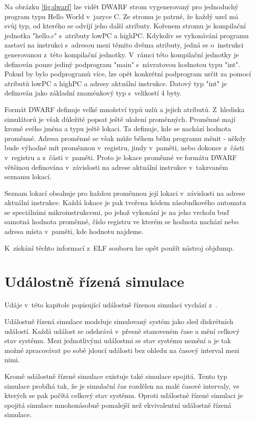 Na obrázku \ref{fig:dwarf} lze vidět DWARF strom vygenerovaný pro jednoduchý program typu Hello World v~jazyce C. Ze stromu je patrné, že každý uzel má svůj typ, od kterého se odvíjí jeho další atributy. Kořenem stromu je kompilační jednotka "hello.c" s~atributy lowPC a highPC. Kdykoliv se vykonávání programu zastaví na instrukci s~adresou mezi těmito dvěma atributy, jedná se o~instrukci generovanou z~této kompilační jednotky. V~rámci této kompilační jednotky je definován pouze jediný podprogram "main" s~návratovou hodnotou typu "int". Pokud by bylo podprogramů více, lze opět konkrétní podprogram určit za pomocí atributů lowPC a highPC a adresy aktuální instrukce. Datový typ "int" je definován jako základní znaménkový typ s~velikostí 4 byty.

Formát DWARF definuje velké množství typů uzlů a jejich atributů. Z~hlediska simulátorů je však důležité popsat ještě uložení proměnných. Proměnné mají kromě svého jména a typu ještě lokaci. Ta definuje, kde se nachází hodnota proměnné. Adresa proměnné se však může během běhu programu měnit - někdy bude výhodné mít proměnnou v~registru, jindy v~paměti, nebo dokonce z~části v~registru a z~části v~paměti. Proto je lokace proměnné ve formátu DWARF většinou definována v~závislosti na adrese aktuální instrukce v~takzvaném seznamu lokací.

Seznam lokací obsahuje pro každou proměnnou její lokaci v~závislosti na adrese aktuální instrukce. Každá lokace je pak tvořena kódem zásobníkového automatu se speciálními mikroinstrukcemi, po jehož vykonání je na jeho vrcholu buď samotná hodnota proměnné, číslo registru ve kterém se hodnota nachází nebo
adresa místa v~paměti, kde hodnotu najdeme.

K~získání těchto informací z~ELF souboru lze opět použít nástroj objdump.

\chapter{Událostně řízená simulace}

Udáje v~této kapitole popisující událostně řízenou simulaci vychází z~\cite{nutaro}.

Událostně řízená simulace modeluje simulovaný systém jako sled diskrétních událostí. Každá událost se odehrává v~přesně stanoveném čase a mění celkový
stav systému. Mezi jednotlivými událostmi se stav systému nemění a je tak možné zpracovávat po sobě jdoucí události bez ohledu na časový interval
mezi nimi.

Kromě událostně řízené simulace existuje také simulace spojitá. Tento typ simulace probíhá tak, že je simulační čas rozdělen na malé časové intervaly, ve kterých se pak počítá celkový stav systému. Oproti událostně řízené simulaci je spojitá simulace mnohonásobně pomalejší než ekvivalentní událostně řízená simulace.

